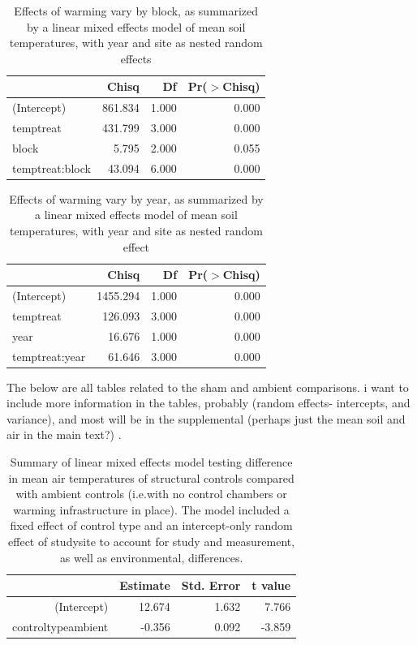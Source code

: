 \documentclass{article}
\begin{document}
\begin{table}[ht]
\centering
\begin{tabular}{lrrr}
  \hline
 & Chisq & Df & Pr($>$Chisq) \\ 
  \hline
(Intercept) & 861.834 & 1.000 & 0.000 \\ 
  temptreat & 431.799 & 3.000 & 0.000 \\ 
  block & 5.795 & 2.000 & 0.055 \\ 
  temptreat:block & 43.094 & 6.000 & 0.000 \\ 
   \hline
\end{tabular}
\caption{Effects of warming vary by block, as summarized by a linear mixed effects model of mean soil temperatures, with year and site as nested random effects} 
\end{table}
\begin{table}[ht]
\centering
\begin{tabular}{lrrr}
  \hline
 & Chisq & Df & Pr($>$Chisq) \\ 
  \hline
(Intercept) & 1455.294 & 1.000 & 0.000 \\ 
  temptreat & 126.093 & 3.000 & 0.000 \\ 
  year & 16.676 & 1.000 & 0.000 \\ 
  temptreat:year & 61.646 & 3.000 & 0.000 \\ 
   \hline
\end{tabular}
\caption{Effects of warming vary by year, as summarized by a linear mixed effects model of mean soil temperatures, with year and site as nested random effect} 
\end{table}\par The below are all tables related to the sham and ambient comparisons. i want to include more information in the tables, probably (random effects- intercepts, and variance), and most will be in the supplemental (perhaps just the mean soil and air in the main text?)
.
\par 
\begin{table}[ht]
\centering
\begin{tabular}{rrrr}
  \hline
 & Estimate & Std. Error & t value \\ 
  \hline
(Intercept) & 12.674 & 1.632 & 7.766 \\ 
  controltypeambient & -0.356 & 0.092 & -3.859 \\ 
   \hline
\end{tabular}
\caption{Summary of linear mixed effects model testing difference in mean air temperatures of structural controls compared with ambient controls (i.e.with no control chambers or warming infrastructure in place). The model included a fixed effect of control type and an intercept-only random effect of studysite to account for study and measurement, as well as environmental, differences.} 
\end{table}
\end{document}
